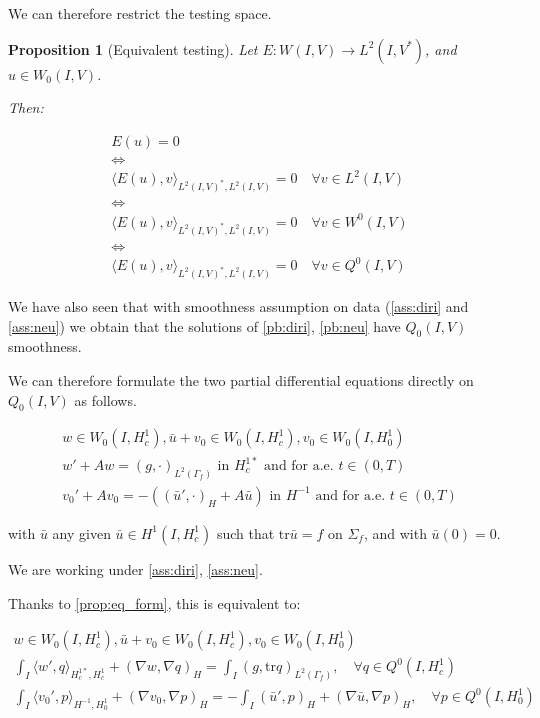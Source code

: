 \documentclass[english,a4paper,12pt,oneside]{scrbook}
\theoremstyle{break}
\newtheorem{prop}[equation]{Proposition}
\theoremstyle{remark}
\newcommand{\tr}{\text{tr}}
\begin{document}
We can therefore restrict the testing space.

\begin{prop}[Equivalent testing]
\label{prop:eq_test}
Let $E: W(I,V)\rightarrow L^2(I,V^*)$, and $u\in W_0(I,V)$.

Then:

\begin{align*}
E(u)=0 \\
\iff \\
\langle E(u), v\rangle_{L^2(I,V)^*, L^2(I,V)}=0 \quad \forall v \in L^2(I,V)\\
\iff \\
\langle E(u), v\rangle_{L^2(I,V)^*, L^2(I,V)}=0 \quad \forall v \in W^0(I,V)\\
\iff \\
\langle E(u), v\rangle_{L^2(I,V)^*, L^2(I,V)}=0 \quad \forall v \in Q^0(I,V)
\end{align*}

\end{prop}


We have also seen that with smoothness assumption on data (\cref{ass:diri} and \cref{ass:neu}) we obtain that the solutions of \cref{pb:diri}, \cref{pb:neu} have $Q_0(I,V)$ smoothness. 

We can therefore formulate the two partial differential equations directly on $Q_0(I,V)$ as follows.

\begin{align*}
w \in W_0(I, H^1_c),\bar{u}+v_0 \in W_0(I,H^1_c), v_0 \in W_0(I,H^1_0)\\
w' + A w = (g,\cdot)_{L^2(\Gamma_f)} \text{ in }H^{1*}_c \text{ and for a.e. } t \in (0,T) \\
v_0' + A v_0 = -((\bar{u}',\cdot)_H+A \bar{u}) \text{ in }H^{-1} \text{ and for a.e. } t \in (0,T) 
\end{align*}

with $\bar{u}$ any given $\bar{u}\in H^1(I,H^1_c)$ such that $\tr \bar{u} =f$ on $\Sigma_f$, and with $\bar{u}(0)=0$.

We are working under \ref{ass:diri}, \ref{ass:neu}.

Thanks to \cref{prop:eq_form}, this is equivalent to:

\begin{align*}
w \in W_0(I, H^1_c), \bar{u}+v_0 \in W_0(I,H^1_c), v_0 \in W_0(I,H^1_0) \\
\int_I \langle w' , q\rangle_{H^{1*}_c,H^1_c}+ (\nabla w, \nabla q)_H = \int_I(g,\tr q)_{L^2(\Gamma_f)}, \quad \forall q \in Q^0(I, H^1_c) \\
\int_I \langle v_0',p\rangle_{H^{-1},H^1_0} + (\nabla v_0, \nabla p)_H= -\int_I(\bar{u}',p)_H+(\nabla \bar{u}, \nabla p)_H, \quad \forall p \in Q^0(I, H^1_0) 
\end{align*}
\end{document}
